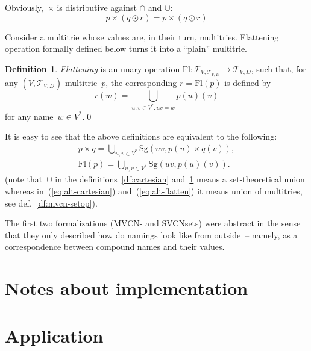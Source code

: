 \documentclass{article}
\theoremstyle{definition}
\newtheorem{Df}{Definition}
\newcommand{\setcharmt}{T}
\newcommand{\setsymbol}[3]{\mathcal{#1}_{#2,#3}}
\newcommand{\setmt}[2]{\setsymbol{\setcharmt}{#1}{#2}}
\newcommand{\flatten}{\mathrm{Fl}}
\newcommand{\singleleaf}{\mathrm{Sg}}
\begin{document}
Obviously,~$\times$ is distributive against $\cap$ and $\cup$:
\[
  p\times(q\odot r) = p\times(q\odot r)
\]

Consider a multitrie whose values are, in their turn, multitries.
Flattening operation formally defined below turns it into a ``plain'' multitrie.
\begin{Df}\label{df:flatten}
\emph{Flattening} is an unary operation $\flatten : \setmt{V}{\setmt{V}{D}}
\to\setmt{V}{D}$, such that, for any $(V,\setmt{V}{D})$-multitrie~$p$, the
corresponding $r=\flatten(p)$ is defined by
\[
  r(w) = \bigcup_{u,v\in V^\ast: uv = w} p(u)(v)
\]
for any name~$w\in V^\ast$.\qed
\end{Df}

It is easy to see that the above definitions are equivalent to the following:
\begin{eqnarray}
  \label{eq:alt-cartesian}
  p\times q =
    \bigcup_{u,v\in V^\ast} \singleleaf(uv, p(u) \times q(v)) ,\\
  \label{eq:alt-flatten}
  \flatten(p) =
    \bigcup_{u,v\in V^\ast} \singleleaf(uv, p(u)(v)) .
\end{eqnarray}
(note that~$\cup$ in the definitions~\ref{df:cartesian} and~\ref{df:flatten}
means a set-theoretical union whereas in~(\ref{eq:alt-cartesian})
and~(\ref{eq:alt-flatten}) it means union of multitries, see
def.~\ref{df:mvcn-setop}).

The first two formalizations (MVCN- and SVCNsets) were abstract in the sense
that they only described how do namings look like from outside~-- namely, as a
correspondence between compound names and their values.

\section{Notes about implementation}

\section{Application}
\end{document}
